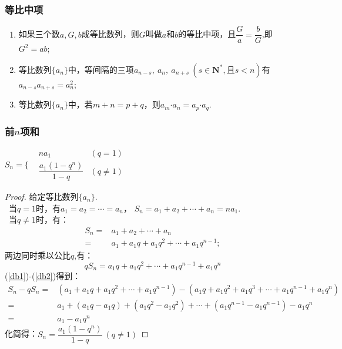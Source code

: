   \subsubsection{等比中项}
    \begin{enumerate}[(1)]
      \item 如果三个数$ a,G,b $成等比数列，则$ G $叫做$ a $和$ b $的等比中项，且$ \dfrac{G}{a}=\dfrac{b}{G} $,即$ G^2=ab $;
      \item 等比数列$ \{a_n\} $中，等间隔的三项$ a_{n-s},~a_n,~a_{n+s}~(s\in\mathbf{N^*},\text{且} s<n ) $有$ a_{n-s}a_{n+s}=a_n^2 $;
      \item 等比数列$ \{a_n\} $中，若$ m+n=p+q $，则$ a_m\bm{\cdot}a_n=a_p\bm{\cdot}a_q $.
    \end{enumerate}
  \subsubsection{前$ n $项和}
    $S_n=\Bigg\{\begin{aligned}
    &na_1&\left(q=1\right)\\
    &\dfrac{a_1\left(1-q^n\right)}{1-q}&\left(q\ne1\right)
    \end{aligned}$
    \begin{proof}
      给定等比数列$\{a_n\}$.\\
      ~当$ q=1$时，有$ a_1=a_2=\cdots=a_n $，
        $ S_n=a_1+a_2+\cdots+a_n=na_1. $\\
      ~当$ q\ne1 $时，有：
        \begin{equation}\label{db1}
          \begin{aligned}
            S_n=&a_1+a_2+\cdots+a_n \\
            =&a_1+a_1q+a_1q^2+\cdots+a_1q^{n-1};
          \end{aligned}
        \end{equation}
        两边同时乘以公比$q$,有：
        \begin{equation}\label{db2}
          qS_n=a_1q+a_1q^2+\cdots+a_1q^{n-1}+a_1q^n
        \end{equation}
        (\ref{db1})-(\ref{db2})得到：
        \begin{equation*}
          \begin{aligned}
            S_n-qS_n=&\left(a_1+a_1q+a_1q^2+\cdots+a_1q^{n-1}\right)-\left(a_1q+a_1q^2+a_1q^3+\cdots+a_1q^{n-1}+a_1q^n\right)\\
            =&a_1+\left(a_1q-a_1q\right)+\left(a_1q^2-a_1q^2\right)+\cdots+\left(a_1q^{n-1}-a_1q^{n-1}\right)-a_1q^n\\
            =&a_1-a_1q^n
          \end{aligned}
        \end{equation*}
        化简得：$ S_n=\dfrac{a_1(1-q^n)}{1-q}~(q\ne1) $
    \end{proof}
